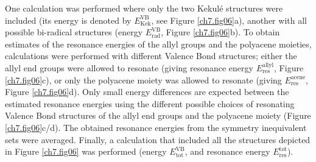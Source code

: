 One calculation was performed where only the two Kekul\'e structures were included (its energy is denoted by $E^\mathrm{VB}_\mathrm{Kek}$, see Figure \ref{ch7.fig06}a), another with all possible bi-radical structures (energy $E^\mathrm{VB}_\mathrm{rad}$, Figure \ref{ch7.fig06}b). To obtain estimates of the resonance energies of the allyl groups and the polyacene moieties, calculations were performed with different Valence Bond structures; either the allyl end groups were allowed to resonate (giving resonance energy $E^\mathrm{allyl}_\mathrm{res}$, Figure \ref{ch7.fig06}c), or only the polyacene moiety was allowed to resonate (giving $E^\mathrm{acene}_\mathrm{res}$, Figure \ref{ch7.fig06}d). Only small energy differences are expected between the estimated resonance energies using the different possible choices of resonating Valence Bond structures of the allyl end groups and the polyacene moiety (Figure \ref{ch7.fig06}c/d). The obtained resonance energies from the symmetry inequivalent sets were averaged. Finally, a calculation that included all the structures depicted in Figure \ref{ch7.fig06}  was performed (energy $E^\mathrm{VB}_\mathrm{tot}$, and resonance energy $E^\mathrm{tot}_\mathrm{res}$).

